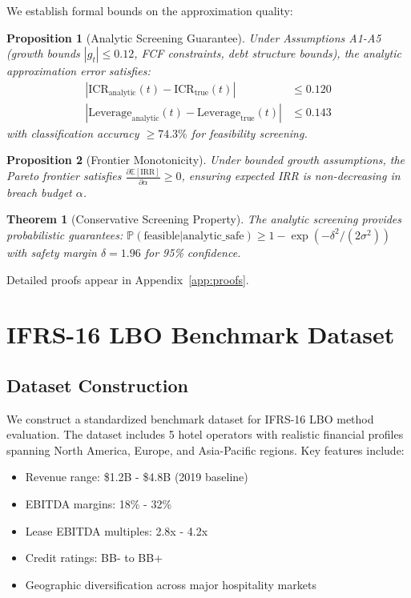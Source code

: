 \documentclass[11pt,a4paper]{article}
\newtheorem{proposition}{Proposition}
\newtheorem{theorem}{Theorem}
\newcommand{\E}{\mathbb{E}}
\newcommand{\Prob}{\mathbb{P}}
\begin{document}
We establish formal bounds on the approximation quality:

\begin{proposition}[Analytic Screening Guarantee]
Under Assumptions A1-A5 (growth bounds $|g_t| \leq 0.12$, FCF constraints, debt structure bounds), the analytic approximation error satisfies:
\begin{align}
|\text{ICR}_{\text{analytic}}(t) - \text{ICR}_{\text{true}}(t)| &\leq 0.120 \\
|\text{Leverage}_{\text{analytic}}(t) - \text{Leverage}_{\text{true}}(t)| &\leq 0.143
\end{align}
with classification accuracy $\geq 74.3\%$ for feasibility screening.
\end{proposition}

\begin{proposition}[Frontier Monotonicity]
Under bounded growth assumptions, the Pareto frontier satisfies $\frac{\partial \E[\text{IRR}]}{\partial \alpha} \geq 0$, ensuring expected IRR is non-decreasing in breach budget $\alpha$.
\end{proposition}

\begin{theorem}[Conservative Screening Property]
The analytic screening provides probabilistic guarantees: $\Prob(\text{feasible} | \text{analytic\_safe}) \geq 1 - \exp(-\delta^2/(2\sigma^2))$ with safety margin $\delta = 1.96$ for 95\% confidence.
\end{theorem}

Detailed proofs appear in Appendix~\ref{app:proofs}.

\section{IFRS-16 LBO Benchmark Dataset}

\subsection{Dataset Construction}

We construct a standardized benchmark dataset for IFRS-16 LBO method evaluation. The dataset includes 5 hotel operators with realistic financial profiles spanning North America, Europe, and Asia-Pacific regions. Key features include:

\begin{itemize}
\item Revenue range: \$1.2B - \$4.8B (2019 baseline)
\item EBITDA margins: 18\% - 32\%  
\item Lease EBITDA multiples: 2.8x - 4.2x
\item Credit ratings: BB- to BB+
\item Geographic diversification across major hospitality markets
\end{itemize}
\end{document}
